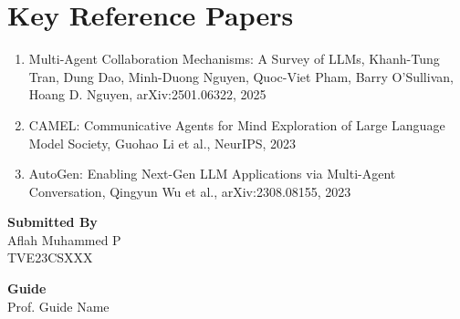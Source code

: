 \documentclass[12pt]{article}
\newcommand{\studentname}{Aflah Muhammed P}
\newcommand{\rollno}{TVE23CSXXX}
\newcommand{\guidename}{Prof. Guide Name}
\begin{document}
\section*{Key Reference Papers}
\begin{enumerate}
  \item Multi-Agent Collaboration Mechanisms: A Survey of LLMs, Khanh-Tung Tran, Dung Dao, Minh-Duong Nguyen, Quoc-Viet Pham, Barry O'Sullivan, Hoang D. Nguyen, arXiv:2501.06322, 2025
  \item CAMEL: Communicative Agents for Mind Exploration of Large Language Model Society, Guohao Li et al., NeurIPS, 2023
  \item AutoGen: Enabling Next-Gen LLM Applications via Multi-Agent Conversation, Qingyun Wu et al., arXiv:2308.08155, 2023
\end{enumerate}
\vspace{1.5em}

\noindent\textbf{Submitted By}\\
\studentname\\
\rollno

\vspace{1em}
\noindent\textbf{Guide}\\
\guidename
\end{document}
